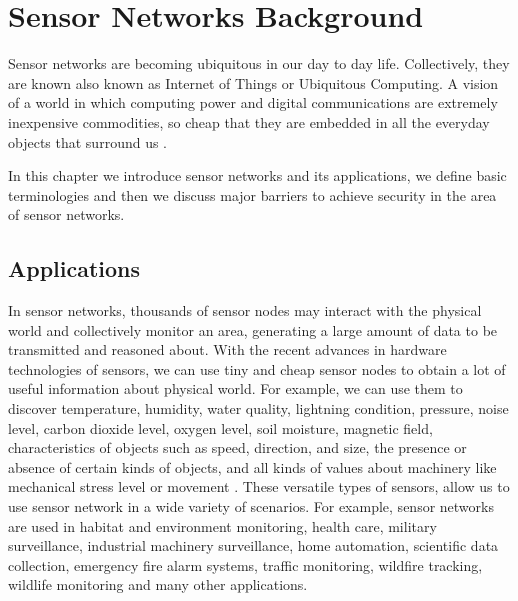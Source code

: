 \chapter{Sensor Networks Background} 
\label{cha:Sensor Networks/Data Aggregation/Security Background}
	
	Sensor networks are becoming ubiquitous in our day to day life. 
	Collectively, they are known also known as Internet of Things or Ubiquitous Computing.
	A vision of a world in which computing power and digital communications are extremely inexpensive commodities, so cheap that they are embedded in all the everyday objects that surround us \cite{2002-Stajano-ubiquitous}.
	
	In this chapter we introduce sensor networks and its applications, we define basic terminologies and then we discuss major 
	barriers to achieve security in the area of sensor networks.

\section{Applications}
	In sensor networks, thousands of sensor nodes may interact with the physical world and collectively monitor an area, generating a large amount of data to be transmitted and reasoned about.
	With the recent advances in hardware technologies of sensors, we can use tiny and cheap sensor nodes to obtain a lot of useful information about physical world.
	For example, we can use them to discover temperature, humidity, water quality, lightning condition, pressure, noise level, carbon dioxide level, oxygen level, soil moisture, magnetic field, characteristics of objects such as speed, direction, and size, the presence or absence of certain kinds of objects, and all kinds of values about machinery like mechanical stress level or movement \cite{hof2007applications}.
	These versatile types of sensors, allow us to use sensor network in a wide variety of scenarios.
	For example, sensor networks are used in habitat and environment monitoring, health care, military surveillance, industrial machinery surveillance, home automation, scientific data collection, emergency fire alarm systems, traffic monitoring, wildfire tracking, wildlife monitoring and many other applications.
	

